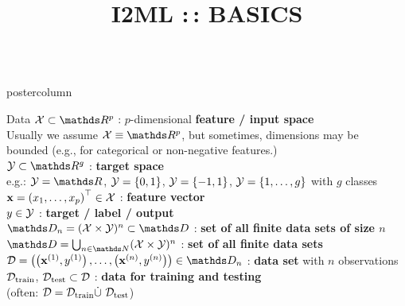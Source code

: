 \documentclass{beamer}
\title{I2ML :\,: BASICS} %
\newlength{\columnheight} %
\begin{document}
\begin{frame}[fragile]{}
\vspace{-8ex}
\begin{columns}
	\begin{column}{.31\textwidth}
		\begin{beamercolorbox}[center]{postercolumn}
			\begin{minipage}{.98\textwidth}
				\parbox[t][\columnheight]{\textwidth}{
\begin{myblock}{Data}
 $\Xspace \subset \R^p$ : $p$-dimensional \textbf{feature / input space}\\ 
\hspace*{1ex}Usually we assume $\Xspace \equiv \R^p$, but sometimes, dimensions may be \\  
\hspace*{1ex}bounded (e.g., for categorical or non-negative features.)    \\

$\Yspace \subset \R^g$ : \textbf{target space} \\ 
\hspace*{1ex}e.g.: $\Yspace = \R$, $\mathcal{Y} = \lbrace 0, 1 \rbrace$, $\mathcal{Y} = \lbrace -1, 1 \rbrace$, $\mathcal{Y} = \{1, \ldots, g\}$ with $g$ classes\\

$\mathbf{x} = \left(x_1, \ldots, x_p\right)^\top \in \mathcal{X}$ : \textbf{feature vector} \\ 
 
$y \in \mathcal{Y}$ : \textbf{target / label / output} \\
 
$\allDatasetsn = \defAllDatasetsn \subset \allDatasets$ : \textbf{set of all finite data sets of size $n$} \\

$\allDatasets = \defAllDatasets$ : \textbf{set of all finite data sets} \\
 
$\D = \Dset \in \allDatasetsn $ : \textbf{data set} with $n$ observations \\
 
$\mathcal{D}_{\text{train}}$, $\mathcal{D}_{\text{test}} \subset \mathcal{D}$ : \textbf{data for training and testing} \\ 
(often: $\mathcal{D} = \mathcal{D}_{\text{train}} \dot{\cup} ~ \mathcal{D}_{\text{test}}$)\\
 

\end{myblock}}
\end{minipage}
\end{beamercolorbox}
\end{column}
\end{columns}
\end{frame}
\end{document}
